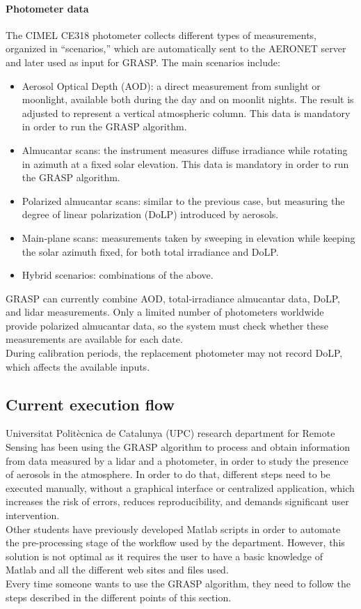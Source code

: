 \paragraph{Photometer data}
The CIMEL CE318 photometer collects different types of measurements, organized in “scenarios,” which are automatically sent to the AERONET server and later used as input for GRASP. The main scenarios include:
\begin{itemize}
  \item Aerosol Optical Depth (AOD): a direct measurement from sunlight or moonlight, available both during the day and on moonlit nights. The result is adjusted to represent a vertical atmospheric column. This data is mandatory in order to run the GRASP algorithm.
  \item Almucantar scans: the instrument measures diffuse irradiance while rotating in azimuth at a fixed solar elevation. This data is mandatory in order to run the GRASP algorithm.
  \item Polarized almucantar scans: similar to the previous case, but measuring the degree of linear polarization (DoLP) introduced by aerosols.  
  \item Main‑plane scans: measurements taken by sweeping in elevation while keeping the solar azimuth fixed, for both total irradiance and DoLP.  
  \item Hybrid scenarios: combinations of the above.
\end{itemize}
GRASP can currently combine AOD, total‑irradiance almucantar data, DoLP, and lidar measurements. Only a limited number of photometers worldwide provide polarized almucantar data, so the system must check whether these measurements are available for each date.\smallskip\\
During calibration periods, the replacement photometer may not record DoLP, which affects the available inputs.
\subsection{Current execution flow}
Universitat Polit\`ecnica de Catalunya (UPC) research department for Remote Sensing has been using the GRASP algorithm to process and obtain information from data measured by a lidar and a photometer, in order to study the presence of aerosols in the atmosphere. In order to do that, different steps need to be executed manually, without a graphical interface or centralized application, which increases the risk of errors, reduces reproducibility, and demands significant user intervention.\smallskip\\
Other students have previously developed Matlab scripts in order to automate the pre-processing stage of the workflow used by the department. However, this solution is not optimal as it requires the user to have a basic knowledge of Matlab and all the different web sites and files used. \smallskip\\
Every time someone wants to use the GRASP algorithm, they need to follow the steps described in the different points of this section.
